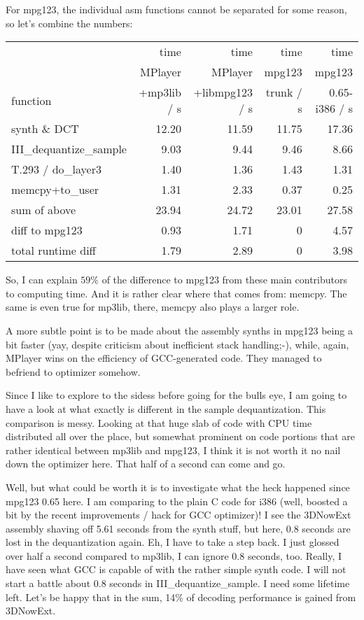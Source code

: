 \documentclass[a4paper,12pt]{scrartcl}
\begin{document}
For mpg123, the individual asm functions cannot be separated for some reason, so let's combine the numbers:
\begin{center}
\begin{tabular}{lrrrr}
         & time & time & time & time  \\
         & MPlayer & MPlayer & mpg123 & mpg123 \\
function & +mp3lib / s & +libmpg123 / s & trunk / s & 0.65-i386 / s
\\\hline
synth \& DCT            & 12.20 & 11.59 & 11.75 & 17.36 \\
III\_dequantize\_sample &  9.03 &  9.44 &  9.46 &  8.66 \\
T.293 / do\_layer3      &  1.40 &  1.36 &  1.43 &  1.31 \\
memcpy+to\_user         &  1.31 &  2.33 &  0.37 &  0.25 \\
sum of above            & 23.94 & 24.72 & 23.01 & 27.58 \\
diff to mpg123          &  0.93 & 1.71  &  0    &  4.57 \\
total runtime diff      &  1.79 & 2.89  &  0    &  3.98 
\end{tabular}
\end{center}
So, I can explain $59\%$ of the difference to mpg123 from these main contributors to computing time. And it is rather clear where that comes from: memcpy.
The same is even true for mp3lib, there, memcpy also plays a larger role.

A more subtle point is to be made about the assembly synths in mpg123 being a bit faster (yay, despite criticism about inefficient stack handling;-), while, again, MPlayer wins on the efficiency of GCC-generated code.
They managed to befriend to optimizer somehow.

Since I like to explore to the sidess before going for the bulls eye, I am going to have a look at what exactly is different in the sample dequantization.
This comparison is messy. Looking at that huge slab of code with CPU time distributed all over the place, but somewhat prominent on code portions that are rather identical between mp3lib and mpg123, I think it is not worth it no nail down the optimizer here. That half of a second can come and go.

Well, but what could be worth it is to investigate what the heck happened since mpg123 0.65 here. I am comparing to the plain C code for i386 (well, boosted a bit by the recent improvements / hack for GCC optimizer)!
I see the 3DNowExt assembly shaving off 5.61 seconds from the synth stuff, but here, 0.8 seconds are lost in the dequantization again.
Eh, I have to take a step back. I just glossed over half a second compared to mp3lib, I can ignore 0.8 seconds, too. Really, I have seen what GCC is capable of with the rather simple synth code.
I will not start a battle about 0.8 seconds in III\_dequantize\_sample. I need some lifetime left.
Let's be happy that in the sum, 14\% of decoding performance is gained from 3DNowExt.
\end{document}
